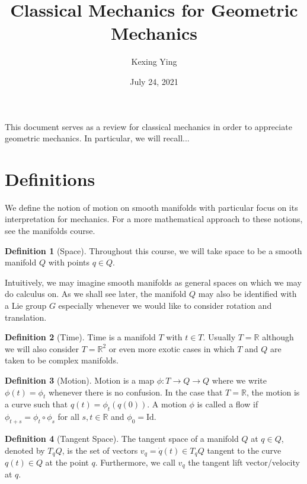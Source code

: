 \documentclass[]{article}
\title{Classical Mechanics for Geometric Mechanics}
\author{Kexing Ying}
\date{July 24, 2021}
\theoremstyle{definition}
\theoremstyle{definition}
\newtheorem{definition}{Definition}[section]
\begin{document}
\maketitle

This document serves as a review for classical mechanics in order to appreciate 
geometric mechanics. In particular, we will recall...

\section*{Definitions}

We define the notion of motion on smooth manifolds with particular focus on 
its interpretation for mechanics. For a more mathematical approach to these 
notions, see the manifolds course.

\begin{definition}[Space]
  Throughout this course, we will take space to be a smooth manifold \(Q\) with 
  points \(q \in Q\). 
\end{definition}

Intuitively, we may imagine smooth manifolds as general spaces on which we may 
do calculus on. As we shall see later, the manifold \(Q\) may also be identified 
with a Lie group \(G\) especially whenever we would like to consider rotation 
and translation. 

\begin{definition}[Time]
  Time is a manifold \(T\) with \(t \in T\). Usually \(T = \mathbb{R}\) although 
  we will also consider \(T = \mathbb{R}^2\) or even more exotic cases in which 
  \(T\) and \(Q\) are taken to be complex manifolds. 
\end{definition}

\begin{definition}[Motion]
  Motion is a map \(\phi : T \to Q \to Q\) where we write \(\phi(t) = \phi_t\) 
  whenever there is no confusion. In the case that \(T = \mathbb{R}\), the motion 
  is a curve such that \(q(t) = \phi_t(q(0))\). A motion \(\phi\) is called a 
  flow if \(\phi_{t + s} = \phi_t \circ \phi_s\) for all \(s, t \in \mathbb{R}\) 
  and \(\phi_0 = \text{Id}\).
\end{definition}

\begin{definition}[Tangent Space]
  The tangent space of a manifold \(Q\) at \(q \in Q\), denoted by \(T_q Q\), 
  is the set of vectors \(v_q = \dot q(t) \in T_q Q\) tangent to the curve 
  \(q(t) \in Q\) at the point \(q\). Furthermore, we call \(v_q\) the tangent 
  lift vector/velocity at \(q\).
\end{definition}
\end{document}
